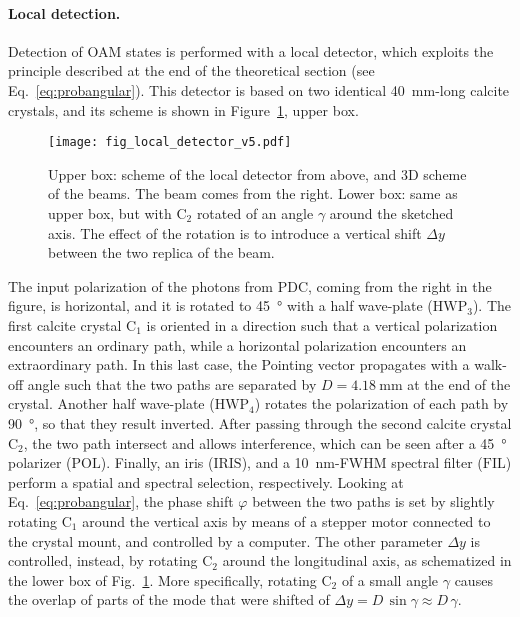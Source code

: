 \documentclass[
reprint,
amsmath,amssymb,
aps,
showkeys
]{revtex4-2}
\begin{document}
\paragraph*{Local detection.}
Detection of OAM states is performed with a local detector, which exploits the principle described at the end of the theoretical section (see Eq.~\ref{eq:probangular}).
This detector is based on two identical \SI{40}{\milli\meter}-long calcite crystals, and its scheme is shown in Figure~\ref{fig:localdet}, upper box.
%
\begin{figure}
\texttt{[image: fig\_local\_detector\_v5.pdf]}
\caption{Upper box: scheme of the local detector from above, and 3D scheme of the beams.
The beam comes from the right.
Lower box: same as upper box, but with $\mathrm{C}_2$ rotated of an angle $\gamma$ around the sketched axis.
The effect of the rotation is to introduce a vertical shift $\Delta y$ between the two replica of the beam.}
\label{fig:localdet}
\end{figure}
%
The input polarization of the photons from PDC, coming from the right in the figure, is horizontal, and it is rotated to \SI{45}{\degree} with a half wave-plate ($\mathrm{HWP}_3$).
The first calcite crystal $\mathrm{C}_1$ is oriented in a direction such that a vertical polarization encounters an ordinary path, while a horizontal polarization encounters an extraordinary path.
In this last case, the Pointing vector propagates with a walk-off angle such that the two paths are separated by $D = \SI{4.18}{\milli\meter}$ at the end of the crystal.
Another half wave-plate ($\mathrm{HWP}_4$) rotates the polarization of each path by \SI{90}{\degree}, so that they result inverted.
After passing through the second calcite crystal $\mathrm{C}_2$, the two path intersect and allows interference, which can be seen after a \SI{45}{\degree} polarizer ($\mathrm{POL}$).
Finally, an iris ($\mathrm{IRIS}$), and a \SI{10}{\nano\meter}-FWHM spectral filter ($\mathrm{FIL}$) perform a spatial and spectral selection, respectively.
Looking at Eq.~\ref{eq:probangular}, the phase shift $\varphi$ between the two paths is set by slightly rotating $\mathrm{C}_1$ around the vertical axis by means of a stepper motor connected to the crystal mount, and controlled by a computer.
The other parameter $\Delta y$ is controlled, instead, by rotating $\mathrm{C}_2$ around the longitudinal axis, as schematized in the lower box of Fig.~\ref{fig:localdet}.
More specifically, rotating $\mathrm{C}_2$ of a small angle $\gamma$ causes the overlap of parts of the mode that were shifted of $\Delta y = D\,\sin\gamma \approx D\,\gamma$.
\end{document}
